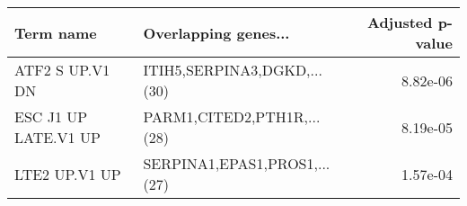 \begin{tabular}{llr}
\toprule
           Term name &         Overlapping genes... &  Adjusted p-value \\
\midrule
     ATF2 S UP.V1 DN &  ITIH5,SERPINA3,DGKD,...(30) &          8.82e-06 \\
ESC J1 UP LATE.V1 UP &   PARM1,CITED2,PTH1R,...(28) &          8.19e-05 \\
       LTE2 UP.V1 UP & SERPINA1,EPAS1,PROS1,...(27) &          1.57e-04 \\
\bottomrule
\end{tabular}
